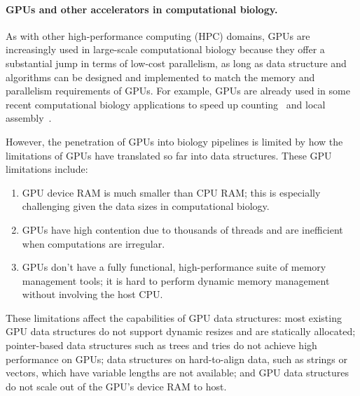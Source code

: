 \paragraph{GPUs and other accelerators in computational biology.}
As with other high-performance computing (HPC) domains,
GPUs are increasingly used in large-scale computational biology because they offer a substantial jump in terms of low-cost parallelism, as long as data structure and algorithms can be designed and implemented to match the memory and parallelism requirements of GPUs.
%
For example, GPUs are already used in some recent computational biology applications to speed up \kmer counting~\cite{nisa2021distributed} and local assembly~\cite{awan2021accelerating}.

However, the penetration of GPUs into biology pipelines is limited by how the limitations of GPUs have translated so far into data structures.  These GPU limitations include:
\begin{enumerate}[leftmargin=*,noitemsep,nolistsep]
  \item GPU device RAM is much smaller than CPU RAM\@; this is especially
    challenging given the data sizes in computational biology.
  \item GPUs have high contention due to thousands of threads and are
    inefficient when computations are irregular.
  \item GPUs don't have a fully functional, high-performance suite of memory management tools; it is hard to perform dynamic memory management without involving the host CPU\@. 
\end{enumerate}

These limitations affect the capabilities of GPU data structures: most existing GPU data structures do not support dynamic resizes and are statically allocated; pointer-based data structures such as trees and tries do not achieve high performance on GPUs; data structures on hard-to-align data, such as strings or vectors, which have variable lengths are not available; and GPU data structures do not scale out of the GPU's device RAM to host.

